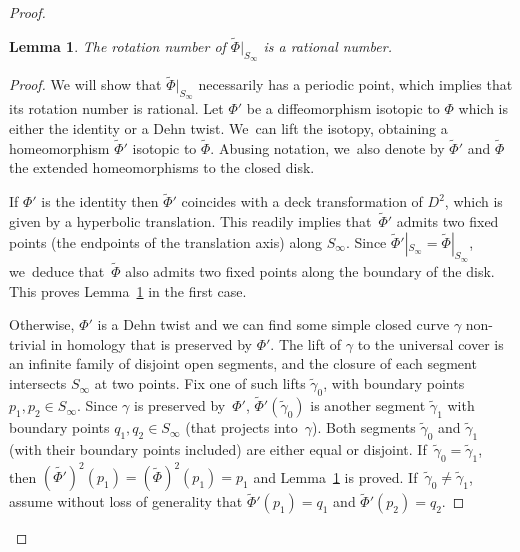 \documentclass[10pt]{amsart}
\newtheorem{lemma}[theorem]{Lemma}
\theoremstyle{definition}
\begin{document}
\begin{proof}
\begin{lemma}\label{lemma: rational}
The rotation number of $\widetilde{\Phi}|_{S_\infty}$ is a rational number.
\end{lemma}

\begin{proof}
We will show that $\widetilde{\Phi}|_{S_\infty}$ necessarily has a periodic point, which implies that its rotation number is rational. Let $\Phi'$ be a diffeomorphism isotopic to $\Phi$ which is either the identity or a Dehn twist. We~can lift the isotopy, obtaining a homeomorphism $\widetilde \Phi'$ isotopic to $\widetilde \Phi$. Abusing notation, we~also denote by $\widetilde \Phi'$ and $\widetilde \Phi$ the extended homeomorphisms to the closed disk.

If $\Phi'$ is the identity then $\widetilde \Phi'$ coincides with a deck transformation of $D^2$, which is given by a hyperbolic translation. This readily implies that~$\widetilde \Phi'$ admits two fixed points (the endpoints of the translation axis) along $S_\infty$. Since $\widetilde \Phi'|_{S_\infty}=\widetilde \Phi|_{S_\infty}$, we~deduce that~$\widetilde \Phi$ also admits two fixed points along the boundary of the disk. This proves Lemma~\ref{lemma: rational} in the first case.

Otherwise, $\Phi'$ is a Dehn twist and we can find some simple closed curve $\gamma$ non-trivial in homology that is preserved by $\Phi'$. The lift of $\gamma$ to the universal cover is an infinite family of disjoint open segments, and the closure of each segment intersects $S_\infty$ at two points. Fix one of such lifts $\widetilde \gamma_0$, with boundary points $p_1,p_2 \in S_\infty$. Since $\gamma$ is preserved by~$\Phi'$, $\widetilde \Phi'(\widetilde \gamma_0)$ is another segment $\widetilde \gamma_1$ with boundary points $q_1, q_2 \in S_\infty$ (that projects into~$\gamma$). Both segments $\widetilde \gamma_0$ and $\widetilde \gamma_1$ (with their boundary points included) are either equal or disjoint. If~$\widetilde{\gamma}_0=\widetilde{\gamma}_1$, then $(\widetilde{\Phi'})^2(p_1)=(\widetilde{\Phi})^2(p_1)=p_1$ and Lemma~\ref{lemma: rational} is proved. If~$\widetilde{\gamma}_0\neq \widetilde{\gamma}_1$, assume without loss of generality that $\widetilde \Phi'(p_1)=q_1$ and $\widetilde \Phi'(p_2)=q_2$.


\end{proof}
\end{proof}
\end{document}
